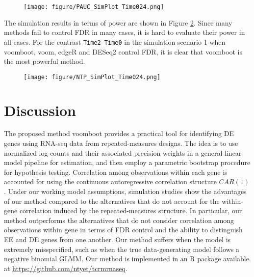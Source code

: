 \begin{figure}[!htbp]
\centering
\texttt{[image: figure/PAUC\_SimPlot\_Time024.png]}
       \label{RMfig6}
\end{figure}

The simulation results in terms of power are shown in Figure \ref{RMfig7}. Since many methods  fail to control FDR in many cases, it is hard to evaluate their power in all cases. For the contrast \texttt{Time2-Time0} in the simulation scenario 1 when voomboot, voom, edgeR and  DESeq2 control FDR, it is clear that voomboot is the most powerful method.


\begin{figure}[!htbp]
\centering
\texttt{[image: figure/NTP\_SimPlot\_Time024.png]}
       \label{RMfig7}
\end{figure}


\section{Discussion}\label{RMdiscussion}

The proposed method voomboot provides a practical tool for identifying DE genes using RNA-seq data from  repeated-measures designs. The  idea is to use normalized log-counts and their associated precision weights in a general linear model pipeline for estimation,  and then employ a parametric bootstrap procedure for hypothesis testing. Correlation among observations within each gene is accounted for using the continuous autoregressive correlation structure $CAR(1)$.   Under our working model assumptions, simulation studies show the advantages of our method compared to the alternatives  that do not account for the within-gene correlation induced by the repeated-measures structure. In particular, our method outperforms the alternatives that do not consider correlation among observations within gene in terms of FDR control and the ability to distinguish EE  and DE genes from one another. 
Our method suffers when the model is extremely misspecified, such as when the true data-generating model follows a negative binomial GLMM. Our method is implemented in an R package available at \href{https://github.com/ntyet/tcrmrnaseq}{https://github.com/ntyet/tcrmrnaseq}.

